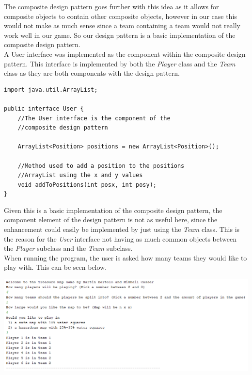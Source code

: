 \documentclass[a4paper,12pt]{extarticle}
\begin{document}
\noindent The composite design pattern goes further with this idea as it allows for composite objects to contain other composite objects, however in our case this would not make as much sense since a team containing a team would not really work well in our game. So our design pattern is a basic implementation of the composite design pattern.\\

\noindent A User interface was implemented as the component within the composite design pattern. This interface is implemented by both the \textit{Player} class and the \textit{Team} class as they are both components with the design pattern.\\

\vspace{-1mm}
\begin{lstlisting}
import java.util.ArrayList;

public interface User {
    //The User interface is the component of the 
    //composite design pattern

    ArrayList<Position> positions = new ArrayList<Position>();

    //Method used to add a position to the positions 
    //ArrayList using the x and y values
    void addToPositions(int posx, int posy);
}
\end{lstlisting}
\vspace{4mm}

\noindent Given this is a basic implementation of the composite design pattern, the component element of the design pattern is not as useful here, since the enhancement could easily be implemented by just using the \textit{Team} class. This is the reason for the \textit{User} interface not having as much common objects between the \textit{Player} subclass and the \textit{Team} subclass.\\

\noindent When running the program, the user is asked how many teams they would like to play with. This can be seen below.

\begin{center}
\includegraphics[scale=0.5]{Team3.png}\\
\end{center}
\end{document}
